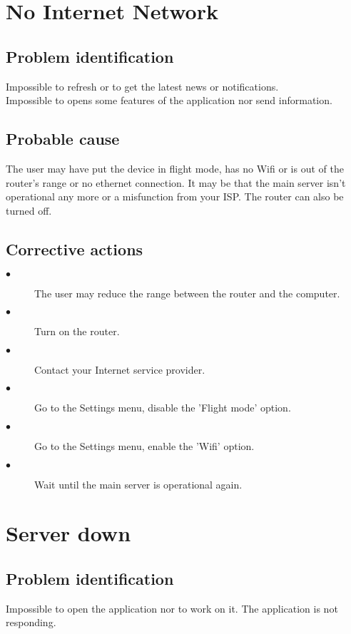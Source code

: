 \section{No Internet Network}

\subsection{Problem identification}
Impossible to refresh or to get the latest news or notifications.\\
Impossible to opens some features of the application nor send information.

\subsection{Probable cause}
The user may have put the device in flight mode, has no Wifi or is out of the
router's range or no ethernet connection. It may be that the main server isn't
operational any more or a misfunction from your ISP. The router can also be
turned off.

\subsection{Corrective actions}
\begin{description} 
\item[$\bullet$] The user may reduce the range between the router and the
computer.
\item[$\bullet$] Turn on the router.
\item[$\bullet$] Contact your Internet service provider.
\item[$\bullet$] Go to the Settings menu, disable the 'Flight mode' option.
\item[$\bullet$] Go to the Settings menu, enable the 'Wifi' option.
\item[$\bullet$] Wait until the main server is operational again.
\end{description} 

\section{Server down}

\subsection{Problem identification}
Impossible to open the application nor to work on it. The application is not
responding.

